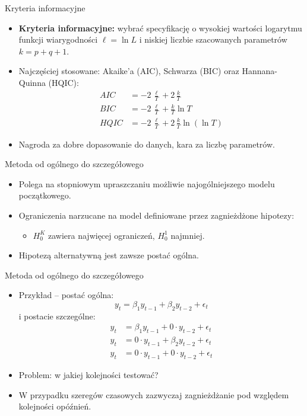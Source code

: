 \documentclass[11pt,usenames,dvipsnames,aspectratio=169]{beamer}
\begin{document}
\begin{frame}{Kryteria informacyjne}
\begin{itemize}
    \item \textbf{Kryteria informacyjne:} wybrać specyfikację o wysokiej wartości logarytmu funkcji wiarygodności $\ell=\ln L$ i niskiej liczbie szacowanych parametrów $k=p+q+1$.
    \item Najczęściej stosowane: Akaike'a (AIC), Schwarza (BIC) oraz Hannana-Quinna (HQIC):
    \begin{align*}
    AIC  & =-2\,\frac{\ell}{T}+2\,\frac{k}{T}\\
    BIC  & =-2\,\frac{\ell}{T}+\frac{k}{T}\ln T\\
    HQIC & =-2\,\frac{\ell}{T}+2\,\frac{k}{T}\ln(\ln T)
    \end{align*}
    \item Nagroda za dobre dopasowanie do danych, kara za liczbę parametrów.
\end{itemize}
\end{frame}

\begin{frame}{Metoda od ogólnego do szczegółowego}
\begin{itemize}
    \item Polega na stopniowym upraszczaniu możliwie najogólniejszego modelu początkowego.
    \item Ograniczenia narzucane na model definiowane przez zagnieżdżone hipotezy:
    \begin{itemize}
        \item $H_{0}^{K}$ zawiera najwięcej ograniczeń, $H_{0}^{1}$ najmniej.
    \end{itemize}
    \item Hipotezą alternatywną jest zawsze postać ogólna.
\end{itemize}
\end{frame}

\begin{frame}{Metoda od ogólnego do szczegółowego}
\begin{itemize}
    \item Przykład -- postać ogólna:
    \[
    y_{t}=\beta_{1}y_{t-1}+\beta_{2}y_{t-2}+\epsilon_{t}
    \]
    i postacie szczególne:
    \begin{align*}
    y_{t} & =\beta_{1}y_{t-1}+0\cdot y_{t-2}+\epsilon_{t}\\
    y_{t} & =0\cdot y_{t-1}+\beta_{2}y_{t-2}+\epsilon_{t}\\
    y_{t} & =0\cdot y_{t-1}+0\cdot y_{t-2}+\epsilon_{t}
    \end{align*}
    \item Problem: w jakiej kolejności testować?
    \item W przypadku szeregów czasowych zazwyczaj zagnieżdżanie pod względem kolejności opóźnień.
\end{itemize}
\end{frame}
\end{document}
